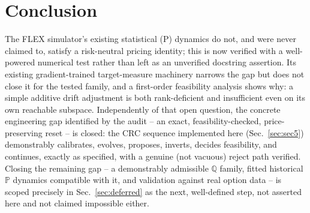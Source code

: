 \documentclass[11pt]{article}
\newcommand{\Q}{\mathbb Q}
\newcommand{\Pp}{\mathbb P}
\begin{document}






\section{Conclusion}
\label{sec:conclusion}

The FLEX simulator's existing statistical (P) dynamics do not, and were never
claimed to, satisfy a risk-neutral pricing identity; this is now verified with a
well-powered numerical test rather than left as an unverified docstring
assertion. Its existing gradient-trained target-measure machinery narrows the
gap but does not close it for the tested family, and a first-order feasibility
analysis shows why: a simple additive drift adjustment is both rank-deficient
and insufficient even on its own reachable subspace. Independently of that open
question, the concrete engineering gap identified by the audit -- an exact,
feasibility-checked, price-preserving reset -- is closed: the CRC sequence
implemented here (Sec.~\ref{sec:sec5}) demonstrably calibrates, evolves,
proposes, inverts, decides feasibility, and continues, exactly as specified,
with a genuine (not vacuous) reject path verified. Closing the remaining gap --
a demonstrably admissible $\Q$ family, fitted historical $\Pp$ dynamics compatible
with it, and validation against real option data -- is scoped precisely in
Sec.~\ref{sec:deferred} as the next, well-defined step, not asserted here and not
claimed impossible either.
\end{document}
